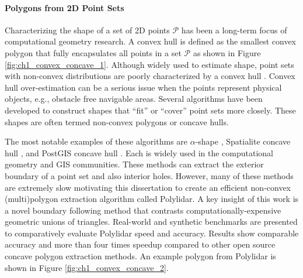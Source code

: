 




\paragraph{Polygons from 2D Point Sets}

Characterizing the shape of a set of 2D points $\mathcal{P}$ has been a long-term focus of computational geometry research. A convex hull is defined as the smallest convex polygon that fully encapsulates all points in a set $\mathcal{P}$ as shown in Figure \ref{fig:ch1_convex_concave_1}.  Although widely used to estimate shape, point sets with non-convex distributions are poorly characterized by a convex hull \cite{duckham_efficient_2008}.  Convex hull over-estimation can be a serious issue when the points represent physical objects, e.g., obstacle free navigable areas. Several algorithms have been developed to construct shapes that ``fit'' or ``cover'' point sets more closely. These shapes are often termed non-convex polygons or concave hulls. 

The most notable examples of these algorithms are $\alpha$-shape \cite{edelsbrunner_shape_1983}, Spatialite concave hull \cite{furieri_spatialite_2017}, and PostGIS concave hull \cite{open_source_geospatial_foundation_postgis_2019}. Each is widely used in the computational geometry and GIS communities. These methods can extract the exterior boundary of a point set and also interior holes.  However, many of these methods are extremely slow motivating this dissertation to create an efficient non-convex (multi)polygon extraction algorithm called Polylidar. A key insight of this work is a novel boundary following method that contrasts computationally-expensive geometric unions of triangles. Real-world and synthetic benchmarks are presented to comparatively evaluate Polylidar speed and accuracy. Results show comparable accuracy and more than four times speedup compared to other open source concave polygon extraction methods. An example polygon from Polylidar is shown in Figure \ref{fig:ch1_convex_concave_2}.

